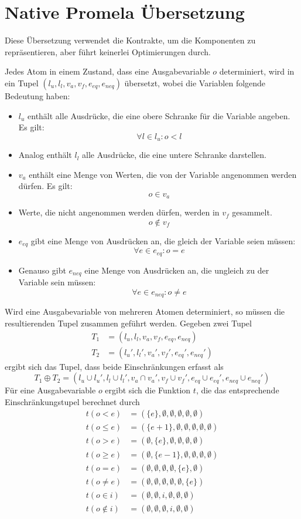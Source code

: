 \section{Native Promela Übersetzung}
Diese Übersetzung verwendet die Kontrakte, um die Komponenten zu repräsentieren, aber führt keinerlei Optimierungen durch.

Jedes Atom in einem Zustand, dass eine Ausgabevariable $o$ determiniert, wird in ein Tupel $(l_u,l_l,v_a,v_f,e_{eq},e_{neq})$ übersetzt, wobei die Variablen folgende Bedeutung haben:
\begin{itemize}
\item $l_u$ enthält alle Ausdrücke, die eine obere Schranke für die Variable angeben.
  Es gilt:
  \[ \forall l\in l_u: o < l \]
\item Analog enthält $l_l$ alle Ausdrücke, die eine untere Schranke darstellen.
\item $v_a$ enthält eine Menge von Werten, die von der Variable angenommen werden dürfen.
  Es gilt:
  \[ o\in v_a \]
\item Werte, die nicht angenommen werden dürfen, werden in $v_f$ gesammelt.
  \[ o\not\in v_f \]
\item $e_{eq}$ gibt eine Menge von Ausdrücken an, die gleich der Variable seien müssen:
  \[ \forall e\in e_{eq}: o=e \]
\item Genauso gibt $e_{neq}$ eine Menge von Ausdrücken an, die ungleich zu der Variable sein müssen:
  \[ \forall e\in e_{neq}: o\neq e \]
\end{itemize}
Wird eine Ausgabevariable von mehreren Atomen determiniert, so müssen die resultierenden Tupel zusammen geführt werden.
Gegeben zwei Tupel
\begin{align*}
  T_1 &= (l_u,l_l,v_a,v_f,e_{eq},e_{neq})\\
  T_2 &= (l_u',l_l',v_a',v_f',e_{eq}',e_{neq}')
\end{align*}
ergibt sich das Tupel, dass beide Einschränkungen erfasst als
\[ T_1\oplus T_2 = (l_u\cup l_u',l_l\cup l_l',v_a\cap v_a',v_f\cup v_f',e_{eq}\cup e_{eq}',e_{neq}\cup e_{neq}') \]
Für eine Ausgabevariable $o$ ergibt sich die Funktion $t$, die das entsprechende Einschränkungstupel berechnet durch
\begin{align*}
  t(o < e) &= (\{e\},\emptyset,\emptyset,\emptyset,\emptyset,\emptyset)\\
  t(o\leq e) &= (\{e+1\},\emptyset,\emptyset,\emptyset,\emptyset,\emptyset)\\
  t(o > e) &= (\emptyset,\{e\},\emptyset,\emptyset,\emptyset,\emptyset)\\
  t(o \geq e) &= (\emptyset,\{e-1\},\emptyset,\emptyset,\emptyset,\emptyset)\\
  t(o = e) &= (\emptyset,\emptyset,\emptyset,\emptyset,\{e\},\emptyset)\\
  t(o\neq e) &= (\emptyset,\emptyset,\emptyset,\emptyset,\emptyset,\{e\})\\
  t(o\in i) &= (\emptyset,\emptyset,i,\emptyset,\emptyset,\emptyset)\\
  t(o\not\in i) &= (\emptyset,\emptyset,\emptyset,i,\emptyset,\emptyset)\\
\end{align*}
